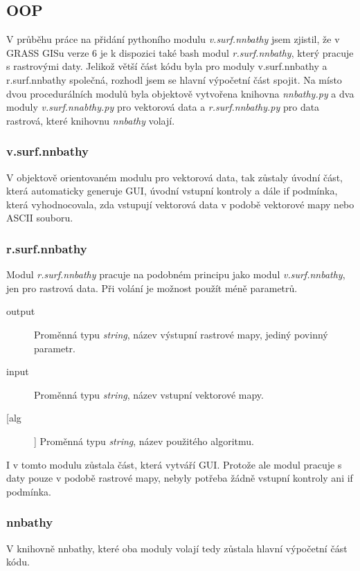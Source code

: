 \documentclass[12pt,a4paper]{article}
\begin{document}
\newpage
\subsection{OOP}
V průběhu práce na přidání pythoního modulu \textit{v.surf.nnbathy} jsem zjistil, že v GRASS GISu verze 6 je k dispozici také bash modul \textit{r.surf.nnbathy}, který pracuje s rastrovými daty. Jelikož větší část kódu byla pro moduly v.surf.nnbathy a r.surf.nnbathy společná, rozhodl jsem se hlavní výpočetní část spojit. Na místo dvou procedurálních modulů byla objektově vytvořena knihovna \textit{nnbathy.py} a dva moduly \textit{v.surf.nnabthy.py} pro vektorová data a \textit{r.surf.nnbathy.py} pro data rastrová, které knihovnu \textit{nnbathy} volají.

\subsubsection{v.surf.nnbathy}
V objektově orientovaném modulu pro vektorová data, tak zůstaly úvodní část, která automaticky generuje GUI, úvodní vstupní kontroly a dále if podmínka, která vyhodnocovala, zda vstupují vektorová data v podobě vektorové mapy nebo ASCII souboru.



\subsubsection{r.surf.nnbathy}
Modul \textit{r.surf.nnbathy} pracuje na podobném principu jako modul \textit{v.surf.nnbathy}, jen pro rastrová data. Při volání je možnost použít méně parametrů.
\begin{description}
\item[output] Proměnná typu \textit{string}, název výstupní rastrové mapy, jediný povinný parametr.
\item[input] Proměnná typu \textit{string}, název vstupní vektorové mapy.
\item[[alg]] Proměnná typu \textit{string}, název použitého algoritmu.
\end{description}


I v tomto modulu zůstala část, která vytváří GUI. Protože ale modul pracuje s daty pouze v podobě rastrové mapy, nebyly potřeba žádně vstupní kontroly ani if podmínka.

\newpage
\subsubsection{nnbathy}
V knihovně nnbathy, které oba moduly volají tedy zůstala hlavní výpočetní část kódu. 
\end{document}
